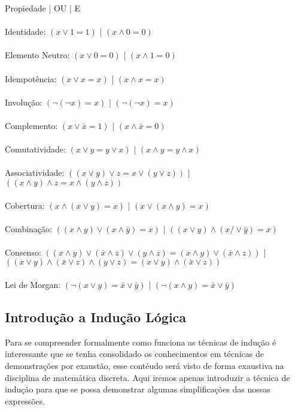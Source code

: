 \documentclass[12pt, onecolumn]{article}
\begin{document}
			Propiedade | OU | E \\ 
	\\
	Identidade: $(x \lor 1 = 1)$ | $(x \land 0 = 0)$ \\
	\\
	Elemento Neutro: $(x \lor 0 = 0)$ | $(x \land 1 = 0)$ \\
	\\
	Idempotência: $(x \lor x = x)$ | $(x \land x = x)$ \\ 
	\\
	Involução: $(\lnot(\lnot x) = x)$ | $(\lnot(\lnot x) = x)$ \\ 
	\\
	Complemento: $(x \lor \bar{x} = 1)$ | $(x \land \bar{x} = 0)$ \\ 
	\\
	Comutatividade: $(x \lor y = y \lor x)$ | $(x \land y = y \land x)$ \\
	\\
	Associatividade: $((x \lor y) \lor z = x \lor (y \lor z))$ | 
	$((x \land y) \land z = x \land (y \land z))$ \\
	\\
	Cobertura: $(x \land (x \lor y) = x)$ | $(x \lor (x \land y) = x)$ \\
	\\
	Combinação: $((x \land y) \lor (x \land \bar{y}) = x)$ | 
	$((x \lor y) \land (x /\lor \bar{y}) = x)$ \\
	\\
	Consenso: $((x \land y) \lor (\bar{x} \land z) \lor (y \land z) = 
	(x \land y) \lor (\bar{x} \land z))$ | 
	$((x \lor y) \land (\bar{x} \lor z) \land (y \lor z) = 
	(x \lor y) \land (\bar{x} \lor z))$ \\
	\\
	Lei de Morgan: $(\lnot(x \lor y) = \bar{x} \lor \bar{y})$ | 
	$(\lnot(x \land y) = \bar{x} \lor \bar{y})$ \\

		\subsection{Introdução a Indução Lógica}
	
	Para se compreender formalmente como funciona as técnicas de indução
	é interessante que se tenha consolidado os conhecimentos em técnicas 
	de demonstrações por exaustão, esse contéudo será visto de forma exaustiva 
	na disciplina de matemática discreta. Aqui iremos apenas introduzir a 
	técnica de indução para que se possa demonstrar algumas simplificações 
	das nossas expressões.\\
		
\end{document}
